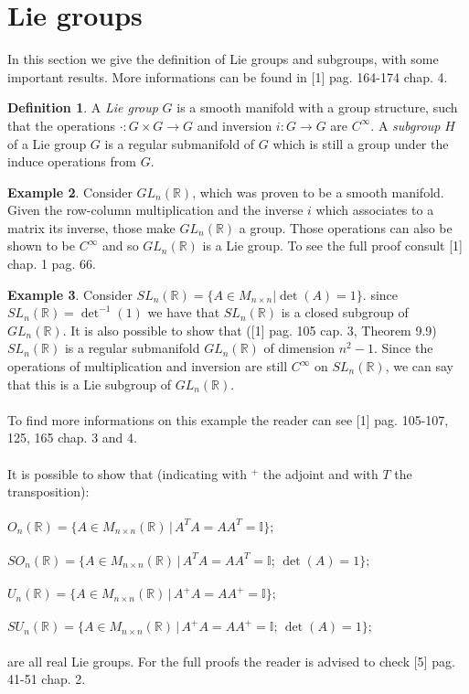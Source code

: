 \documentclass[12pt,a4paper]{report}
\theoremstyle{definition}
\newtheorem{Def}{Definition}[chapter]
\theoremstyle{Theorem}
\theoremstyle{definition}
\newtheorem{Ex}[Def]{Example}
\theoremstyle{definition}
\begin{document}
		\section{Lie groups}
		In this section we give the definition of Lie groups and subgroups, with some important results. More informations can be found in [1] pag. 164-174 chap. 4.
		\begin{Def}
			A \textit{Lie group} $G$ is a smooth manifold with a group structure, such that the operations $\cdot:G\times G\rightarrow G$ and inversion $i:G\rightarrow G$ are $C^\infty$.
			A \textit{subgroup} $H$ of a Lie group $G$ is a regular submanifold of $G$ which is still a group under the induce operations from $G$.
		\end{Def}
		\begin{Ex}
			Consider $GL_n(\mathbb{R})$, which was proven to be a smooth manifold. Given the row-column multiplication and the inverse $i$ which associates to a matrix its inverse, those make $GL_n(\mathbb{R})$ a group. Those operations can also be shown to be $C^\infty$ and so $GL_n(\mathbb{R})$ is a Lie group. To see the full proof consult [1] chap. 1 pag. 66.
		\end{Ex}
		\begin{Ex}
			Consider $SL_n(\mathbb{R})=\{A\in M_{n\times n}| \det(A)=1\}$. since $SL_n(\mathbb{R})=\det^{-1}(1)$ we have that $SL_n(\mathbb{R})$ is a closed subgroup of $GL_n(\mathbb{R})$. It is also possible to show that ([1] pag. 105 cap. 3, Theorem 9.9) $SL_n(\mathbb{R})$ is a regular submanifold $GL_n(\mathbb{R})$ of dimension $n^2-1$. Since the operations of multiplication and inversion are still $C^\infty$ on $SL_n(\mathbb{R})$, we can say that this is a Lie subgroup of $GL_n(\mathbb{R})$.\\
			\\
			To find more informations on this example the reader can see [1] pag. 105-107, 125, 165 chap. 3 and 4.\\
			\\
			It is possible to show that (indicating with $^+$ the adjoint and with $T$ the transposition):\\\\
			$O_n(\mathbb{R})=\{A\in M_{n\times n}(\mathbb{R})\, |\, A^TA=AA^T=\mathbb{I}\};$\\\\
			$SO_n(\mathbb{R})=\{A\in M_{n\times n}(\mathbb{R})\, |\, A^TA=AA^T=\mathbb{I};\, \det(A)=1\};$\\\\
			$U_n(\mathbb{R})=\{A\in M_{n\times n}(\mathbb{R})\, |\, A^+A=AA^+=\mathbb{I}\};$\\\\
			$SU_n(\mathbb{R})=\{A\in M_{n\times n}(\mathbb{R})\, |\, A^+A=AA^+=\mathbb{I};\,\det(A)=1\};$\\\\
			are all real Lie groups. 
			For the full proofs the reader is advised to check [5] pag. 41-51 chap. 2.
		\end{Ex}
\end{document}

